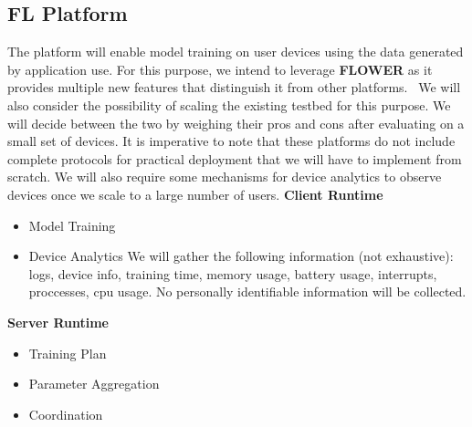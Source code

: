         \subsection{FL Platform}
        The platform will enable model training on user devices using the data generated by application use. For this purpose, we intend to leverage \textbf{FLOWER} as it provides multiple new features that distinguish it from other platforms.~\cite{DBLP:journals/corr/abs-2007-14390} We will also consider the possibility of scaling the existing testbed for this purpose. We will decide between the two by weighing their pros and cons after evaluating on a small set of devices. It is imperative to note that these platforms do not include complete protocols for practical deployment that we will have to implement from scratch. We will also require some mechanisms for device analytics to observe devices once we scale to a large number of users.\newline \newline
        \textbf{Client Runtime}
            \begin{itemize}
                \item Model Training
                \item Device Analytics \newline
                    We will gather the following information (not exhaustive): logs, device info, training time, memory usage, battery usage, interrupts, proccesses, cpu usage. No personally identifiable information will be collected. \newline  
            \end{itemize}
        \textbf{Server Runtime}
            \begin{itemize}
                \item Training Plan
                \item Parameter Aggregation
                \item Coordination
            \end{itemize}
